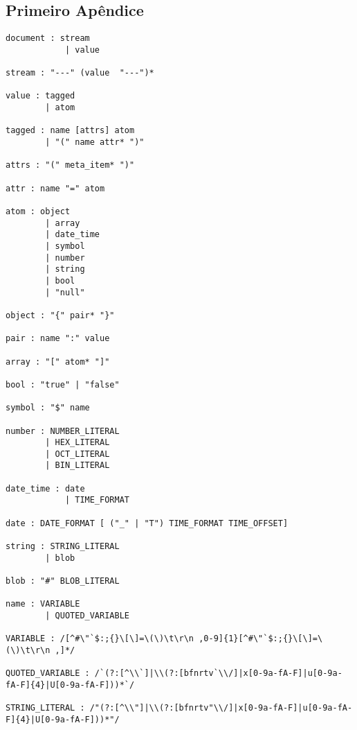 \begin{apendicesenv}

\partapendices

\chapter{Primeiro Apêndice}
\label{sec:fredgrammar}

\begin{lstlisting}[caption=Gramática do FRED,label={lst:fredgrammar}]
document : stream
            | value

stream : "---" (value  "---")*

value : tagged
        | atom

tagged : name [attrs] atom
        | "(" name attr* ")" 

attrs : "(" meta_item* ")"

attr : name "=" atom

atom : object
        | array
        | date_time
        | symbol
        | number
        | string
        | bool
        | "null"

object : "{" pair* "}"

pair : name ":" value

array : "[" atom* "]"

bool : "true" | "false"

symbol : "$" name

number : NUMBER_LITERAL 
        | HEX_LITERAL
        | OCT_LITERAL
        | BIN_LITERAL 

date_time : date
            | TIME_FORMAT

date : DATE_FORMAT [ ("_" | "T") TIME_FORMAT TIME_OFFSET]

string : STRING_LITERAL
        | blob

blob : "#" BLOB_LITERAL

name : VARIABLE
        | QUOTED_VARIABLE

VARIABLE : /[^#\"`$:;{}\[\]=\(\)\t\r\n ,0-9]{1}[^#\"`$:;{}\[\]=\(\)\t\r\n ,]*/

QUOTED_VARIABLE : /`(?:[^\\`]|\\(?:[bfnrtv`\\/]|x[0-9a-fA-F]|u[0-9a-fA-F]{4}|U[0-9a-fA-F]))*`/

STRING_LITERAL : /"(?:[^\\"]|\\(?:[bfnrtv"\\/]|x[0-9a-fA-F]|u[0-9a-fA-F]{4}|U[0-9a-fA-F]))*"/


\end{lstlisting}
\end{apendicesenv}
